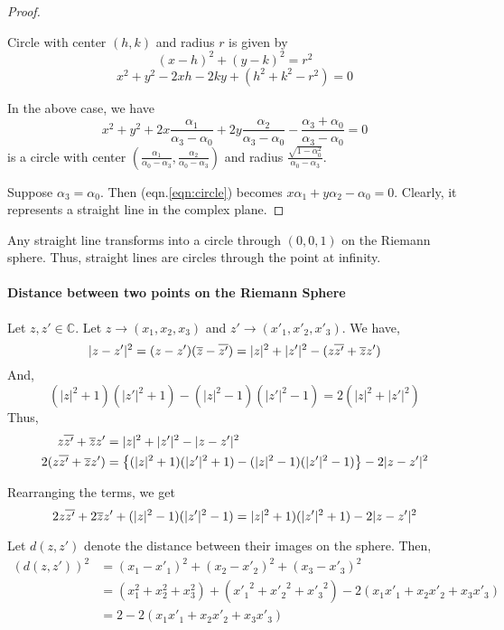 \begin{proof}
	\begin{commentary}
	\begin{definition}[circle]
		Circle with center $(h,k)$ and radius $r$ is given by
		\[ (x-h)^2+(y-k)^2 = r^2 \]
		\[ x^2+y^2-2xh-2ky+(h^2+k^2-r^2) = 0 \]
	\end{definition}
		\noindent In the above case, we have
		\[ x^2+y^2+2x\frac{\alpha_1}{\alpha_3-\alpha_0}+2y\frac{\alpha_2}{\alpha_3-\alpha_0}-\frac{\alpha_3+\alpha_0}{\alpha_3-\alpha_0} = 0 \]
		is a circle with center $\left(\frac{\alpha_1}{\alpha_0-\alpha_3},\frac{\alpha_2}{\alpha_0-\alpha_3}\right)$ and radius $\frac{\sqrt{1-\alpha_0^2}}{\alpha_0-\alpha_3}$.\\
	\end{commentary}

	Suppose $\alpha_3 = \alpha_0$.
	Then (eqn.\ref{eqn:circle}) becomes $x\alpha_1+ y\alpha_2 - \alpha_0 = 0$.
	Clearly, it represents a straight line in the complex plane.
\end{proof}
\begin{important}
	Any straight line transforms into a circle through $(0,0,1)$ on the Riemann sphere.
	Thus, straight lines are circles through the point at infinity.
\end{important}

\paragraph{Distance between two points on the Riemann Sphere}
Let $z,z' \in \mathbb{C}$.
Let $z \to (x_1,x_2,x_3)$ and $z' \to (x'_1,x'_2,x'_3)$.
We have,
\[ |z-z'|^2 = (z-z')(\overline{z}-\overline{z'})  = |z|^2+|{z'}|^2 - (z\overline{z'}+\overline{z}z') \]
And,
\[ (|z|^2+1)(|{z'}|^2+1)-(|z|^2-1)(|{z'}|^2-1) = 2(|z|^2+|{z'}|^2)  \]
Thus,
\begin{align*}
	z\overline{z'}+\overline{z}z'  
	& = |z|^2+|{z'}|^2 - |z-z'|^2 \\
	2(z\overline{z'}+\overline{z}z')  
	& = \left\{ (|z|^2+1)(|{z'}|^2+1) - (|z|^2-1)(|{z'}|^2-1)\right\} - 2|z-{z'}|^2
\end{align*}

\noindent Rearranging the terms, we get
\begin{equation}
	2z\overline{z'}+2\overline{z}z' + (|z|^2-1)(|{z'}|^2-1) = |z|^2+1)(|{z'}|^2+1) - 2|z-{z'}|^2
	\label{eqn:distSub}
\end{equation}

\noindent Let $d(z,z')$ denote the distance between their images on the sphere.
Then,
\begin{align*}
	\left( d(z,z') \right)^2
	& = (x_1-x'_1)^2+(x_2-x'_2)^2+(x_3-x'_3)^2 \\
	& = (x_1^2+x_2^2+x_3^2) + ({x'_1}^2+{x'_2}^2+{x'_3}^2) -2(x_1x'_1+x_2x'_2+x_3x'_3) \\
	& = 2 - 2(x_1x'_1+x_2x'_2+x_3x'_3)
\end{align*}

